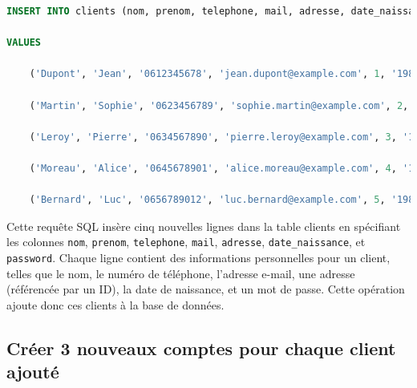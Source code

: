 \documentclass[12pt,a4paper]{article}
\begin{document}
\begin{lstlisting}[language=SQL]
INSERT INTO clients (nom, prenom, telephone, mail, adresse, date_naissance, password)  

VALUES  

    ('Dupont', 'Jean', '0612345678', 'jean.dupont@example.com', 1, '1985-05-15', 'motdepasse1'), 

    ('Martin', 'Sophie', '0623456789', 'sophie.martin@example.com', 2, '1990-08-22', 'motdepasse2'), 

    ('Leroy', 'Pierre', '0634567890', 'pierre.leroy@example.com', 3, '1978-03-10', 'motdepasse3'), 

    ('Moreau', 'Alice', '0645678901', 'alice.moreau@example.com', 4, '1995-11-30', 'motdepasse4'), 

    ('Bernard', 'Luc', '0656789012', 'luc.bernard@example.com', 5, '1982-07-25', 'motdepasse5'); 
\end{lstlisting} 

\vspace{.5cm}

Cette requête SQL insère cinq nouvelles lignes dans la table clients en spécifiant les colonnes \texttt{nom}, \texttt{prenom}, \texttt{telephone}, \texttt{mail}, \texttt{adresse}, \texttt{date\_naissance}, et \texttt{password}. Chaque ligne contient des informations personnelles pour un client, telles que le nom, le numéro de téléphone, l'adresse e-mail, une adresse (référencée par un ID), la date de naissance, et un mot de passe. Cette opération ajoute donc ces clients à la base de données. 
	
	\subsection{Créer 3 nouveaux comptes pour chaque client ajouté}
	
\end{document}
